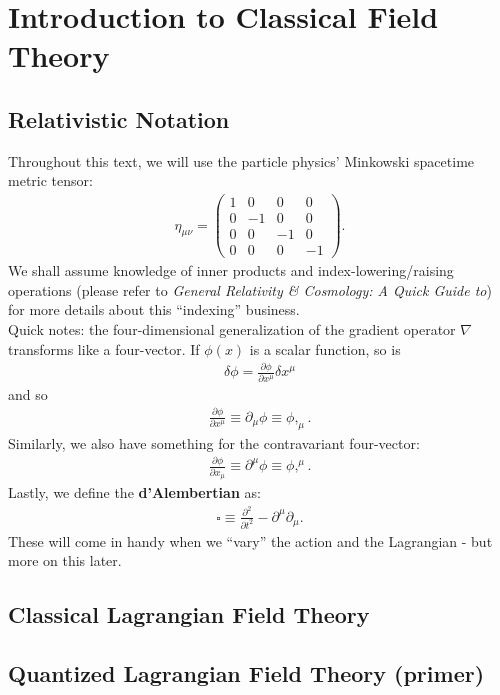 \documentclass[a4paper,11pt]{article}
\numberwithin{equation}{section}
\theoremstyle{definition}
\newcommand{\p}{\partial}
\begin{document}
\newpage

\section{Introduction to Classical Field Theory}
\subsection{Relativistic Notation}
Throughout this text, we will use the particle physics' Minkowski spacetime metric tensor:
\begin{align*}
\eta_{\mu\nu} = \begin{pmatrix}
1&0&0&0\\
0&-1&0&0\\
0&0&-1&0\\
0&0&0&-1
\end{pmatrix}.
\end{align*}
We shall assume knowledge of inner products and index-lowering/raising operations (please refer to \textit{General Relativity \& Cosmology: A Quick Guide to}) for more details about this ``indexing'' business. \\

Quick notes: the four-dimensional generalization of the gradient operator $\nabla$ transforms like a four-vector. If $\phi(x)$ is a scalar function, so is
\begin{align*}
\delta \phi = \frac{\p \phi}{\p x^\mu}\delta x^\mu
\end{align*}
and so
\begin{align*}
\frac{\p \phi}{\p x^\mu} \equiv \p_\mu \phi \equiv \phi,_\mu.
\end{align*}
Similarly, we also have something for the contravariant four-vector:
\begin{align*}
\frac{\p \phi}{\p x_\mu} \equiv \p^\mu \phi \equiv \phi,^\mu.
\end{align*}
Lastly, we define the \textbf{d'Alembertian} as:
\begin{align*}
\square \equiv \frac{\p^2}{\p t^2} - \p^\mu \p_\mu.
\end{align*}
These will come in handy when we ``vary'' the action and the Lagrangian - but more on this later. 

\subsection{Classical Lagrangian Field Theory}
\subsection{Quantized Lagrangian Field Theory (primer)}
\end{document}
